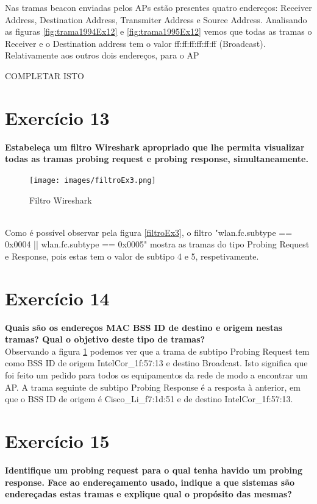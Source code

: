 \documentclass[a4paper]{report}
\begin{document}
Nas tramas beacon enviadas pelos APs estão presentes quatro endereços: Receiver
Address, Destination Address, Transmiter Address e Source Address. Analisando
as figuras \ref{fig:trama1994Ex12} e \ref{fig:trama1995Ex12} vemos que todas as
tramas o Receiver e o Destination address tem o valor ff:ff:ff:ff:ff:ff
(Broadcast). Relativamente aos outros dois endereços, para o AP 

COMPLETAR ISTO 

\section{Exercício 13}
\textbf{Estabeleça um filtro Wireshark apropriado que lhe permita visualizar
    todas as tramas probing request e probing response, simultaneamente.}\\

\begin{figure}[H]
    \centering 
    \texttt{[image: images/filtroEx3.png]}  
    \caption{Filtro Wireshark}
    \label{fig:filtroEx3}
\end{figure}\\

Como é possível observar pela figura \ref{filtroEx3}, o filtro "wlan.fc.subtype 
== 0x0004 || wlan.fc.subtype == 0x0005" mostra as tramas do tipo Probing Request
e Response, pois estas tem o valor de subtipo 4 e 5, respetivamente.

\section{Exercício 14}
\textbf{Quais são os endereços MAC BSS ID de destino e origem nestas tramas?
    Qual o objetivo deste tipo de tramas?}\\

Observando a figura \ref{fig:filtroEx3} podemos ver que a trama de subtipo Probing 
Request tem como BSS ID de origem IntelCor_1f:57:13 e destino Broadcast. Isto 
significa que foi feito um pedido para todos os equipamentos da rede de modo a encontrar
um AP. A trama seguinte de subtipo Probing Response é a resposta à anterior, em que o BSS
ID de origem é Cisco_Li_f7:1d:51 e de destino IntelCor_1f:57:13.

\section{Exercício 15}
\textbf{Identifique um probing request para o qual tenha havido um probing
    response. Face ao endereçamento usado, indique a que sistemas são
    endereçadas estas tramas e explique qual o propósito das mesmas?}\\
\end{document}
